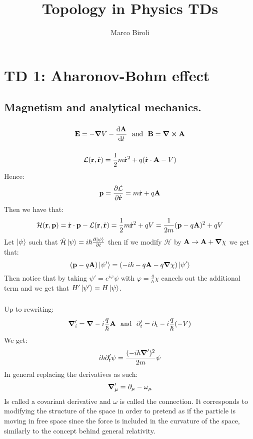 \documentclass[10pt,a4paper]{book}
\author{Marco Biroli}
\title{Topology in Physics TDs}
\begin{document}
\maketitle
\chapter{TD 1: Aharonov-Bohm effect}
\section{Magnetism and analytical mechanics.}
\subsection{}
\[
\vb{E} = -\grad V - \dv{\vb{A}}{t} \mbox{~~and~~} \vb{B} = \curl \vb{A}
\]

\subsection{}
\[
\mathcal{L}(\vb{r}, \dot{\vb{r}}) = \frac{1}{2} m \dot{\vb{r}}^2 + q(\dot{\vb{r}} \cdot \vb{A} - V)
\]
Hence:
\[
\vb{p} = \pdv{\mathcal{L}}{\dot{\vb{r}}} = m \dot{\vb{r}} + q \vb{A}
\]
Then we have that:
\[
\mathcal{H}(\vb{r}, \vb{p}) = \dot{\vb{r}} \cdot  \vb{p} - \mathcal{L}(\vb{r}, \dot{\vb{r}}) = \frac{1}{2} m \dot{\vb{r}}^2 + qV = \frac{1}{2m} (\vb{p} - q\vb{A})^2 + qV
\]
Let $\ket{\psi}$ such that $\hat{\mathcal{H}} \ket{\psi} = i \hbar \pdv{\ket{\psi}}{t}$ then if we modify $\mathcal{H}$ by $\vb{A} \to \vb{A} + \grad \chi$ we get that:
\[
(\vb{p} - q \vb{A}) \ket{\psi'} = (-i\hbar - q \vb{A} - q \grad \chi)\ket{\psi'} 
\] 
Then notice that by taking $\psi' = e^{i\varphi} \psi$ with $\varphi = \frac{q}{\hbar}\chi$ cancels out the additional term and we get that $H' \ket{\psi'} = H \ket{\psi}$.

\subsection{}
Up to rewriting:
\[
\grad'_i = \grad - i \frac{q}{\hbar} \vb{A} \mbox{~~and~~} \partial_t' = \partial_t - i \frac{q}{\hbar}(-V)  
\]
We get:
\[
i\hbar \partial_t' \psi = \frac{(-i\hbar \grad')^2}{2m}\psi
\]
In general replacing the derivatives as such:
\[
\grad'_\mu = \partial_\mu - \omega_\mu
\]
Is called a covariant derivative and $\omega$ is called the connection. It corresponds to modifying the structure of the space in order to pretend as if the particle is moving in free space since the force is included in the curvature of the space, similarly to the concept behind general relativity.
\end{document}
